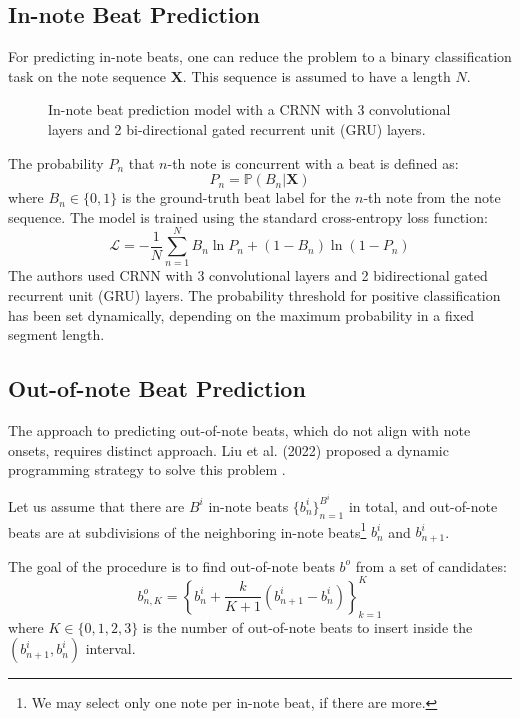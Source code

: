 \subsection{In-note Beat Prediction}

For predicting in-note beats, one can reduce the problem to a binary classification task on the note sequence $\mathbf{X}$. This sequence is assumed to have a length $N$.

\begin{figure}[!ht]
\centering

\caption[In-note beat prediction model]{In-note beat prediction model with a CRNN with 3 convolutional layers and 2 bi-directional gated recurrent unit (GRU) layers.}
\end{figure}

The probability $P_n$ that $n$-th note is concurrent with a beat is defined as: $$P_n = \mathbb{P}\left(B_n|\mathbf{X}\right)$$ where $B_n\in\{0,1\}$ is the ground-truth beat label for the $n$-th note from the note sequence. The model is trained using the standard cross-entropy loss function: $$\mathcal{L}=-\frac{1}{N}\sum_{n=1}^N B_n\ln P_n + \left(1-B_n\right)\ln\left(1-P_n\right)$$ The authors used CRNN with 3 convolutional layers and 2 bidirectional gated recurrent unit (GRU) layers. The probability threshold for positive classification has been set dynamically, depending on the maximum probability in a fixed segment length.

\subsection{Out-of-note Beat Prediction}

The approach to predicting out-of-note beats, which do not align with note onsets, requires distinct approach. Liu et al. (2022) proposed a dynamic programming strategy to solve this problem \cite{Liu2022}.

Let us assume that there are $B^i$ in-note beats $\{b_n^i\}_{n=1}^{B^i}$ in total, and out-of-note beats are at subdivisions of the neighboring in-note beats\footnote{We may select only one note per in-note beat, if there are more.} $b_{n}^i$ and $b_{n+1}^i$.

The goal of the procedure is to find out-of-note beats $b^o$ from a set of candidates: \begin{equation}\label{out_of_note_candidates}
b_{n,K}^o = \left\{b_n^i + \frac{k}{K+1}\left(b_{n+1}^i-b_n^i\right)\right\}_{k=1}^K
\end{equation} where $K\in\{0,1,2,3\}$ is the number of out-of-note beats to insert inside the $\left(b_{n+1}^i, b_n^i\right)$ interval.

